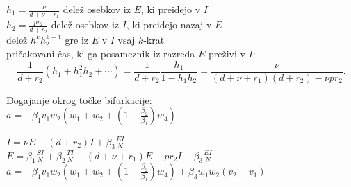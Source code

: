\documentclass[11pt]{beamer}
\begin{document}
\begin{frame}
    \(h_1=\frac{\nu}{d+\nu+r_1}\) delež osebkov iz \(E\), ki preidejo v \(I\)\\ 
    \(h_2=\frac{pr_2}{d+r_2}\) delež osebkov iz \(I\), ki preidejo nazaj v \(E\)\\
    delež \(h_1^{k}h_2^{k-1}\) gre iz \(E\) v \(I\) vsaj \(k\)-krat\\
    pričakovani čas, ki ga posameznik iz razreda \(E\) preživi v \(I\):
    \[\frac{1}{d+r_2}(h_1+h_1^2h_2+\cdots)=\frac{1}{d+r_2}\frac{h_1}{1-h_1h_2}=\frac{\nu}{(d+\nu+r_1)(d+r_2)-\nu pr_2}.\]
\end{frame}

\begin{frame}
Dogajanje okrog točke bifurkacije:\\
\(a=-\beta_1 v_1 w_2(w_1+w_2+(1-\frac{\beta_2}{\beta_1})w_4)\)
\end{frame}

\begin{frame}
    \(\dot{I}=\nu E -(d+r_2)I +\beta_3 \frac{EI}{N}\)\\
    \(\dot{E}= \beta_1\frac{SI}{N}+\beta_2\frac{TI}{N}-(d+\nu+r_1)E+pr_2I-\beta_3 \frac{EI}{N}\)\\
    \(a=-\beta_1v_1w_2(w_1+w_2+(1-\frac{\beta_2}{\beta_1})w_4)+\beta_3w_1w_2(v_2-v_1)\)
\end{frame}
\end{document}
